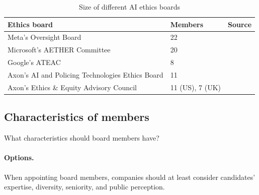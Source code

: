\documentclass{article}
\begin{document}
\renewcommand{\arraystretch}{1.4}
\begin{table}
  \caption{Size of different AI ethics boards}
  \label{table1}
  \centering
  \begin{tabular}{lll}
    \toprule
        \textbf{Ethics board}                               & \textbf{Members}  & \textbf{Source} \\
    \midrule
        Meta’s Oversight Board                              & 22                & \cite{oversightboard2023members}\\
        Microsoft’s AETHER Committee                        & 20                & \cite{newman2020decisionpoints}\\
        Google’s ATEAC                                      & 8                 & \cite{walker2019external}\\
        Axon’s AI and Policing Technologies Ethics Board    & 11                & \cite{axon2019policing}\\
        Axon’s Ethics \& Equity Advisory Council            & 11 (US), 7 (UK)   & \cite{axon2022ethicsequity}\\
    \bottomrule
  \end{tabular}
\end{table}

\subsection{Characteristics of members}\label{Ch:4:4characteristics:}

What characteristics should board members have?

\paragraph{Options.} When appointing board members, companies should at least consider candidates’ expertise, diversity, seniority, and public perception.
\end{document}
